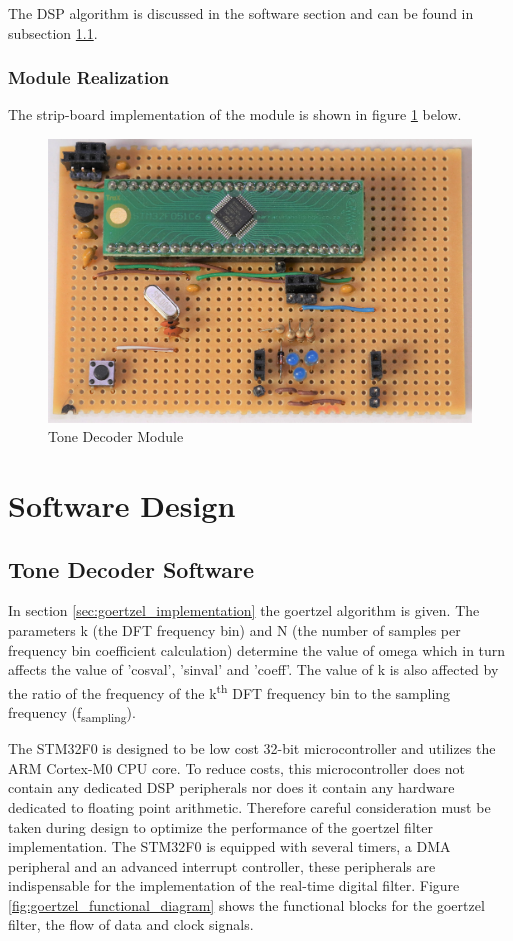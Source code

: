 The DSP algorithm is discussed in the software section and can be found in subsection \ref{tone_decoder_software}.

\subsubsection{Module Realization}
The strip-board implementation of the module is shown in figure \ref{fig:module_tone_decoder} below.

\begin{figure}[H]
	\centering
	\includegraphics[width=.6\textwidth]{figures/modules/goertzel_filter.jpg}
	\caption{Tone Decoder Module}
	\label{fig:module_tone_decoder}
\end{figure}




\section{Software Design}

\subsection{Tone Decoder Software}
\label{tone_decoder_software}

In section \ref{sec:goertzel_implementation} the goertzel algorithm is given. The parameters k (the DFT frequency bin) and N (the number of samples per frequency bin coefficient calculation) determine the value of omega which in turn affects the value of 'cosval', 'sinval' and 'coeff'. The value of k is also affected by the ratio of the frequency of the k\textsuperscript{th} DFT frequency bin to the sampling frequency (f\textsubscript{sampling}).

The STM32F0 is designed to be low cost 32-bit microcontroller and utilizes the ARM Cortex-M0 CPU core. To reduce costs, this microcontroller does not contain any dedicated DSP peripherals nor does it contain any hardware dedicated to floating point arithmetic. Therefore careful consideration must be taken during design to optimize the performance of the goertzel filter implementation. The STM32F0 is equipped with several timers, a DMA peripheral and an advanced interrupt controller, these peripherals are indispensable for the implementation of the real-time digital filter. Figure \ref{fig:goertzel_functional_diagram} shows the functional blocks for the goertzel filter, the flow of data and clock signals.

